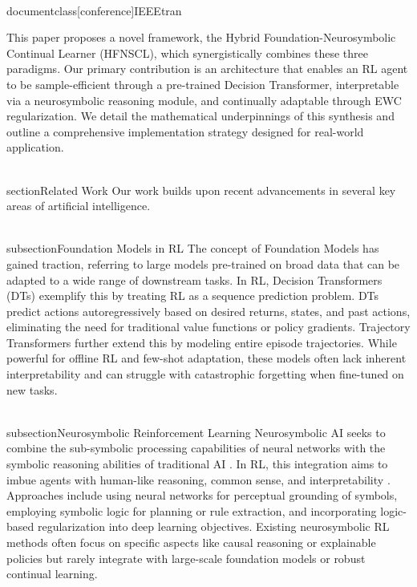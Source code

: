 \\documentclass[conference]{IEEEtran}
\begin{document}
This paper proposes a novel framework, the Hybrid Foundation-Neurosymbolic Continual Learner (HFNSCL), which synergistically combines these three paradigms. Our primary contribution is an architecture that enables an RL agent to be sample-efficient through a pre-trained Decision Transformer, interpretable via a neurosymbolic reasoning module, and continually adaptable through EWC regularization. We detail the mathematical underpinnings of this synthesis and outline a comprehensive implementation strategy designed for real-world application.

\\section{Related Work}
Our work builds upon recent advancements in several key areas of artificial intelligence.

\\subsection{Foundation Models in RL}
The concept of Foundation Models \cite{bommasani2022opportunities} has gained traction, referring to large models pre-trained on broad data that can be adapted to a wide range of downstream tasks. In RL, Decision Transformers (DTs) \cite{chen2021decision} exemplify this by treating RL as a sequence prediction problem. DTs predict actions autoregressively based on desired returns, states, and past actions, eliminating the need for traditional value functions or policy gradients. Trajectory Transformers \cite{janner2021trajectory} further extend this by modeling entire episode trajectories. While powerful for offline RL and few-shot adaptation, these models often lack inherent interpretability and can struggle with catastrophic forgetting when fine-tuned on new tasks.

\\subsection{Neurosymbolic Reinforcement Learning}
Neurosymbolic AI seeks to combine the sub-symbolic processing capabilities of neural networks with the symbolic reasoning abilities of traditional AI \cite{garcez2019neurosymbolic}. In RL, this integration aims to imbue agents with human-like reasoning, common sense, and interpretability \cite{wang2021learning}. Approaches include using neural networks for perceptual grounding of symbols, employing symbolic logic for planning or rule extraction, and incorporating logic-based regularization into deep learning objectives. Existing neurosymbolic RL methods often focus on specific aspects like causal reasoning or explainable policies but rarely integrate with large-scale foundation models or robust continual learning.
\end{document}
